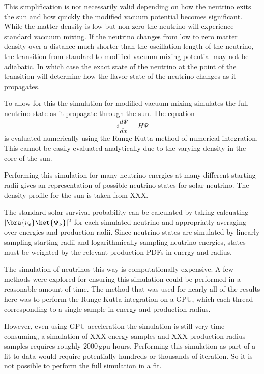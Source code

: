 This simplification is not necessarily valid depending on how the neutrino
exits the sun and how quickly the modified vacuum potential becomes significant.
While the matter density is low but non-zero the neutrino will experience standard
vaccuum mixing. If the neutrino changes from low to zero matter density over
a distance much shorter than the oscillation length of the neutrino, the
transition from standard to modified vacuum mixing potential may not be adiabatic.
In which case the exact state of the neutrino at the point of the transition
will determine how the flavor state of the neutrino changes as it propagates.

To allow for this the simulation for modified vacuum mixing simulates the full
neutrino state as it propagate through the sun. The equation
\begin{equation}
    \label{eqn:mixing_schrodinger}
    i\frac{d\Psi}{dx} = H\Psi %
\end{equation}
is evaluated numerically using the Runge-Kutta method of numerical integration.
This cannot be easily evaluated analytically due to the varying density in the
core of the sun.

Performing this simulation for many neutrino energies at many different starting
radii gives an representation of possible neutrino states for solar neutrino.
The density profile for the sun is taken from XXX.%

The standard solar survival probability can be calculated by taking calcuating
$|\bra{\nu_{e}}\ket{\Psi_{\nu}}|^{2}$ for each simulated neutrino and appropriatly
averaging over energies and production radii.
Since neutrino states are simulated by linearly sampling starting radii and logarithmically
sampling neutrino energies, states must be weighted by the relevant production
PDFs in energy and radius.

The simulation of neutrinos this way is computationally expensive. A few methods
were explored for ensuring this simulation could be performed in a reasonable
amount of time. The method that was used for nearly all of the results here was
to perform the Runge-Kutta integration on a GPU, which each thread corresponding
to a single sample in energy and production radius.

However, even using GPU acceleration the simulation is still very time consuming,
a simulation of XXX energy samples and XXX production radius samples requires
roughly 2000\,gpu-hours. Performing this simulation as part of a fit to data would
require potentially hundreds or thousands of iteration. So it is not possible to
perform the full simulation in a fit.

